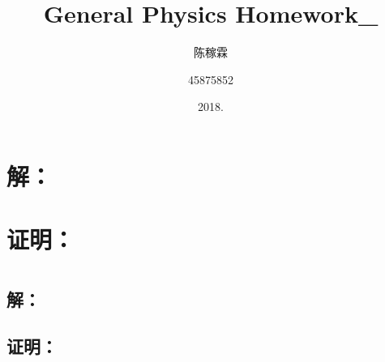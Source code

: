 \documentclass[10pt,a4paper]{article}
\title{General Physics Homework\_{}}
\author{陈稼霖 \and 45875852}
\date{2018.}
\theoremstyle{remark}
\begin{document}
\maketitle
\section{解：}

\section{证明：}

\section{}

\subsection{解：}

\subsection{证明：}
\end{document}
